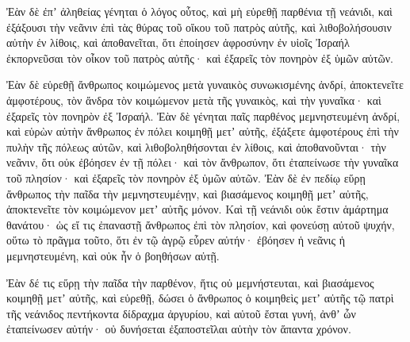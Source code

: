 {\par }{\PP {}Ἐὰν δὲ ἐπʼ ἀληθείας γένηται ὁ λόγος οὗτος, καὶ μὴ εὑρεθῇ παρθένια τῇ νεάνιδι,
καὶ ἐξάξουσι τὴν νεᾶνιν ἐπὶ τὰς θύρας τοῦ οἴκου τοῦ πατρὸς αὐτῆς, καὶ λιθοβολήσουσιν αὐτὴν ἐν λίθοις, καὶ ἀποθανεῖται, ὅτι ἐποίησεν ἀφροσύνην ἐν υἱοῖς Ἰσραήλ ἐκπορνεῦσαι τὸν οἶκον τοῦ πατρὸς αὐτῆς· καὶ ἐξαρεῖς τὸν πονηρὸν ἐξ ὑμῶν αὐτῶν.
\par }{\PP {}Ἐὰν δὲ εὑρεθῇ ἄνθρωπος κοιμώμενος μετὰ γυναικὸς συνωκισμένης ἀνδρί, ἀποκτενεῖτε ἀμφοτέρους, τὸν ἄνδρα τὸν κοιμώμενον μετὰ τῆς γυναικὸς, καὶ τὴν γυναῖκα· καὶ ἐξαρεῖς τὸν πονηρὸν ἐξ Ἰσραήλ.
Ἐὰν δὲ γένηται παῖς παρθένος μεμνηστευμένη ἀνδρί, καὶ εὑρὼν αὐτὴν ἄνθρωπος ἐν πόλει κοιμηθῇ μετʼ αὐτῆς,
ἐξάξετε ἀμφοτέρους ἐπὶ τὴν πυλὴν τῆς πόλεως αὐτῶν, καὶ λιθοβοληθήσονται ἐν λίθοις, καὶ ἀποθανοῦνται· τὴν νεᾶνιν, ὅτι οὐκ ἐβόησεν ἐν τῇ πόλει· καὶ τὸν ἄνθρωπον, ὅτι ἐταπείνωσε τὴν γυναῖκα τοῦ πλησίον· καὶ ἐξαρεῖς τὸν πονηρὸν ἐξ ὑμῶν αὐτῶν.
Ἐὰν δὲ ἐν πεδίῳ εὕρῃ ἄνθρωπος τὴν παῖδα τὴν μεμνηστευμένῃν, καὶ βιασάμενος κοιμηθῇ μετʼ αὐτῆς, ἀποκτενεῖτε τὸν κοιμώμενον μετʼ αὐτῆς μόνον.
Καὶ τῇ νεάνιδι οὐκ ἔστιν ἁμάρτημα θανάτου· ὡς εἴ τις ἐπαναστῇ ἄνθρωπος ἐπὶ τὸν πλησίον, καὶ φονεύσῃ αὐτοῦ ψυχήν, οὕτω τὸ πρᾶγμα τοῦτο,
ὅτι ἐν τῷ ἀγρῷ εὗρεν αὐτήν· ἐβόησεν ἡ νεᾶνις ἡ μεμνηστευμένη, καὶ οὐκ ἦν ὁ βοηθήσων αὐτῇ.
\par }{\PP {}Ἐὰν δέ τις εὕρῃ τὴν παῖδα τὴν παρθένον, ἥτις οὐ μεμνήστευται, καὶ βιασάμενος κοιμηθῇ μετʼ αὐτῆς, καὶ εὑρεθῇ,
δώσει ὁ ἄνθρωπος ὁ κοιμηθεὶς μετʼ αὐτῆς τῷ πατρὶ τῆς νεάνιδος πεντήκοντα δίδραχμα ἀργυρίου, καὶ αὐτοῦ ἔσται γυνή, ἀνθʼ ὧν ἐταπείνωσεν αὐτήν· οὐ δυνήσεται ἐξαποστεῖλαι αὐτὴν τὸν ἅπαντα χρόνον.

}
